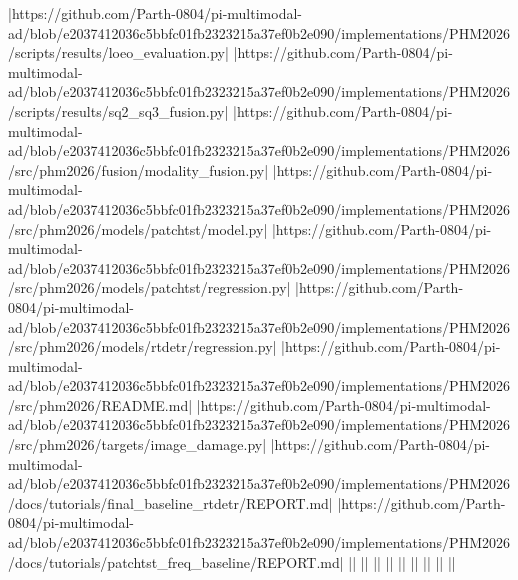|https://github.com/Parth-0804/pi-multimodal-ad/blob/e2037412036c5bbfc01fb2323215a37ef0b2e090/implementations/PHM2026/scripts/results/loeo_evaluation.py|
|https://github.com/Parth-0804/pi-multimodal-ad/blob/e2037412036c5bbfc01fb2323215a37ef0b2e090/implementations/PHM2026/scripts/results/sq2_sq3_fusion.py|
|https://github.com/Parth-0804/pi-multimodal-ad/blob/e2037412036c5bbfc01fb2323215a37ef0b2e090/implementations/PHM2026/src/phm2026/fusion/modality_fusion.py|
|https://github.com/Parth-0804/pi-multimodal-ad/blob/e2037412036c5bbfc01fb2323215a37ef0b2e090/implementations/PHM2026/src/phm2026/models/patchtst/model.py|
|https://github.com/Parth-0804/pi-multimodal-ad/blob/e2037412036c5bbfc01fb2323215a37ef0b2e090/implementations/PHM2026/src/phm2026/models/patchtst/regression.py|
|https://github.com/Parth-0804/pi-multimodal-ad/blob/e2037412036c5bbfc01fb2323215a37ef0b2e090/implementations/PHM2026/src/phm2026/models/rtdetr/regression.py|
|https://github.com/Parth-0804/pi-multimodal-ad/blob/e2037412036c5bbfc01fb2323215a37ef0b2e090/implementations/PHM2026/src/phm2026/README.md|
|https://github.com/Parth-0804/pi-multimodal-ad/blob/e2037412036c5bbfc01fb2323215a37ef0b2e090/implementations/PHM2026/src/phm2026/targets/image_damage.py|
|https://github.com/Parth-0804/pi-multimodal-ad/blob/e2037412036c5bbfc01fb2323215a37ef0b2e090/implementations/PHM2026/docs/tutorials/final_baseline_rtdetr/REPORT.md|
|https://github.com/Parth-0804/pi-multimodal-ad/blob/e2037412036c5bbfc01fb2323215a37ef0b2e090/implementations/PHM2026/docs/tutorials/patchtst_freq_baseline/REPORT.md|
||
||
||
||
||
||
||
||
||
